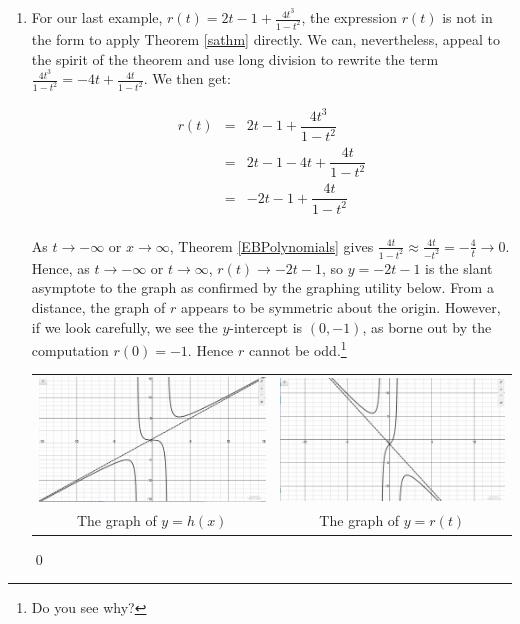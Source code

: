 \begin{ex}
\begin{enumerate}
\item  For our last example,  $r(t) = 2t-1+\frac{4t^3}{1-t^2}$, the expression $r(t)$ is not in the form to apply Theorem \ref{sathm} directly.  We can, nevertheless, appeal to the spirit of the theorem and use long division to rewrite the term $\frac{4t^3}{1-t^2} = -4t + \frac{4t}{1-t^2}$.  We then get:

 \[ \begin{array}{rcl}
 
 r(t) & = & 2t-1+\dfrac{4t^3}{1-t^2} \\
       &= &  2t-1-4t+\dfrac{4t}{1-t^2} \\
       & = & -2t-1 + \dfrac{4t}{1-t^2} \\ \end{array}\]
       
As $t \rightarrow -\infty$ or $x \rightarrow \infty$,  Theorem \ref{EBPolynomials} gives  $\frac{4t}{1-t^2} \approx \frac{4t}{-t^2} = -\frac{4}{t} \rightarrow 0$.  Hence, as $t \rightarrow -\infty$ or $t \rightarrow \infty$, $r(t) \rightarrow -2t-1$, so $y = -2t-1$ is the slant asymptote to the graph as confirmed by the graphing utility below.  From a distance, the graph of $r$ appears to be symmetric about the origin.  However, if we look carefully, we see the $y$-intercept is $(0,-1)$, as borne out by the computation $r(0) = -1$.  Hence $r$ cannot be odd.\footnote{Do you see why?}

\begin{center}
\begin{tabular}{cc}

\includegraphics[width=3in]{./IntroRationalGraphics/SAEx04.jpg}  & \includegraphics[width=3in]{./IntroRationalGraphics/SAEx05.jpg} \\
The graph of $y=h(x)$  & The graph of $y=r(t)$ \\


\end{tabular}
\end{center}

\qed

\end{enumerate}

\end{ex}

